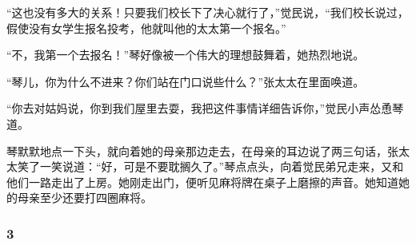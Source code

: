 \par “这也没有多大的关系！只要我们校长下了决心就行了，”觉民说，“我们校长说过，假使没有女学生报名投考，他就叫他的太太第一个报名。”
\par “不，我第一个去报名！”琴好像被一个伟大的理想鼓舞着，她热烈地说。
\par “琴儿，你为什么不进来？你们站在门口说些什么？”张太太在里面唤道。
\par “你去对姑妈说，你到我们屋里去耍，我把这件事情详细告诉你，”觉民小声怂恿琴道。
\par 琴默默地点一下头，就向着她的母亲那边走去，在母亲的耳边说了两三句话，张太太笑了一笑说道：“好，可是不要耽搁久了。”琴点点头，向着觉民弟兄走来，又和他们一路走出了上房。她刚走出门，便听见麻将牌在桌子上磨擦的声音。她知道她的母亲至少还要打四圈麻将。

\subsubsection*{3}

